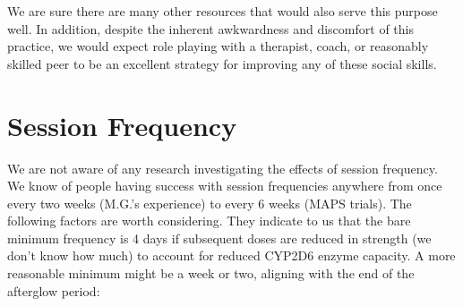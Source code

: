 \documentclass[12pt,letterpaper]{book}
\begin{document}
We are sure there are many other resources that would also serve this purpose well. In addition, despite the inherent awkwardness and discomfort of this practice, we would expect role playing with a therapist, coach, or reasonably skilled peer to be an excellent strategy for improving any of these social skills.
\section{Session Frequency}
\label{frequency}
We are not aware of any research investigating the effects of session frequency. We know of people having success with session frequencies anywhere from once every two weeks (M.G.'s experience) to every 6 weeks (MAPS trials). The following factors are worth considering. They indicate to us that the bare minimum frequency is 4 days if subsequent doses are reduced in strength (we don't know how much) to account for reduced CYP2D6 enzyme capacity. A more reasonable minimum might be a week or two, aligning with the end of the afterglow period:
\end{document}
